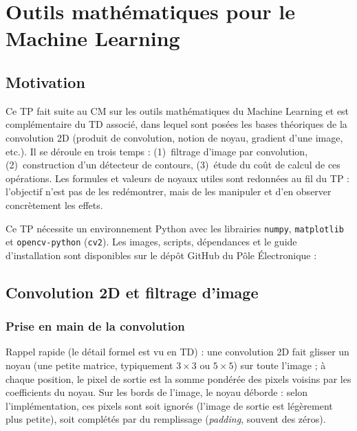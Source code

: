%

\chapter{Outils mathématiques pour le Machine Learning}

\section*{Motivation}

Ce TP fait suite au CM sur les outils mathématiques du Machine Learning et est complémentaire du TD associé, dans lequel sont posées les bases théoriques de la convolution 2D (produit de convolution, notion de noyau, gradient d'une image, etc.). Il se déroule en trois temps : (1)~filtrage d'image par convolution, (2)~construction d'un détecteur de contours, (3)~étude du coût de calcul de ces opérations. Les formules et valeurs de noyaux utiles sont redonnées au fil du TP : l'objectif n'est pas de les redémontrer, mais de les manipuler et d'en observer concrètement les effets. \\

\begin{imp}
Ce TP nécessite un environnement Python avec les librairies \texttt{numpy}, \texttt{matplotlib} et \texttt{opencv-python} (\texttt{cv2}). Les images, scripts, dépendances et le guide d'installation sont disponibles sur le dépôt GitHub du Pôle Électronique : %
\end{imp}

\section{Convolution 2D et filtrage d'image}

\subsection{Prise en main de la convolution}

Rappel rapide (le détail formel est vu en TD) : une convolution 2D fait glisser un noyau (une petite matrice, typiquement $3\times3$ ou $5\times5$) sur toute l'image ; à chaque position, le pixel de sortie est la somme pondérée des pixels voisins par les coefficients du noyau. Sur les bords de l'image, le noyau déborde : selon l'implémentation, ces pixels sont soit ignorés (l'image de sortie est légèrement plus petite), soit complétés par du remplissage (\emph{padding}, souvent des zéros). \\

